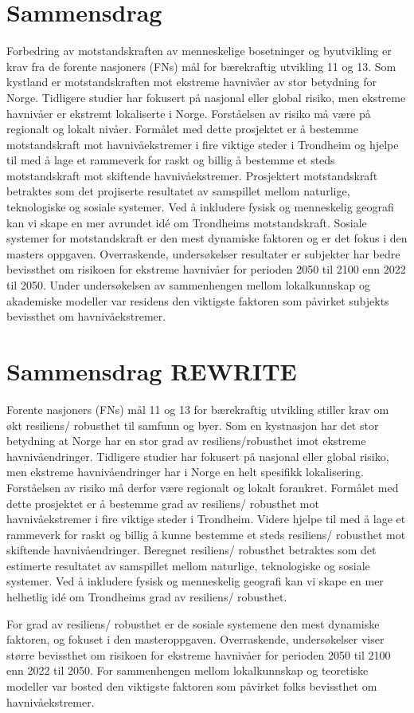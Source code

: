 \section{Sammensdrag}
Forbedring av motstandskraften av menneskelige bosetninger og byutvikling er krav fra de forente nasjoners (FNs) mål for bærekraftig utvikling 11 og 13. Som kystland er motstandskraften mot ekstreme havnivåer av stor betydning for Norge. Tidligere studier har fokusert på nasjonal eller global risiko, men ekstreme havnivåer er ekstremt lokaliserte i Norge. Forståelsen av risiko må være på regionalt og lokalt nivåer. Formålet med dette prosjektet er å bestemme motstandskraft mot havnivåekstremer i fire viktige steder i Trondheim og hjelpe til med å lage et rammeverk for raskt og billig å bestemme et steds motstandskraft mot skiftende havnivåekstremer. Prosjektert motstandskraft betraktes som det projiserte resultatet av samspillet mellom naturlige, teknologiske og sosiale systemer. Ved å inkludere fysisk og menneskelig geografi kan vi skape en mer avrundet idé om Trondheims motstandskraft.
Sosiale systemer for motstandskraft er den mest dynamiske faktoren og er det fokus i den masters oppgaven. Overraskende, undersøkelser resultater er subjekter har bedre bevissthet om risikoen for ekstreme havnivåer for perioden 2050 til 2100 enn 2022 til 2050. Under undersøkelsen av sammenhengen mellom lokalkunnskap og akademiske modeller var residens den viktigste faktoren som påvirket subjekts bevissthet om havnivåekstremer.

\section{Sammensdrag REWRITE}
Forente nasjoners (FNs) mål 11 og 13 for bærekraftig utvikling stiller krav om økt resiliens/ robusthet til samfunn og byer. Som en kystnasjon har det stor betydning at Norge har en stor grad av resiliens/robusthet imot ekstreme havnivåendringer. Tidligere studier har fokusert på nasjonal eller global risiko, men ekstreme havnivåendringer har i Norge en helt spesifikk lokalisering. Forståelsen av risiko må derfor være regionalt og lokalt forankret. Formålet med dette prosjektet er å bestemme grad av resiliens/ robusthet mot havnivåekstremer i fire viktige steder i Trondheim. Videre hjelpe til med å lage et rammeverk for raskt og billig å kunne bestemme et steds resiliens/ robusthet mot skiftende havnivåendringer. Beregnet resiliens/ robusthet betraktes som det estimerte resultatet av samspillet mellom naturlige, teknologiske og sosiale systemer. Ved å inkludere fysisk og menneskelig geografi kan vi skape en mer helhetlig idé om Trondheims grad av resiliens/ robusthet. 

For grad av resiliens/ robusthet er de sosiale systemene den mest dynamiske faktoren, og fokuset i den masteroppgaven. Overraskende, undersøkelser viser større bevissthet om risikoen for ekstreme havnivåer for perioden 2050 til 2100 enn 2022 til 2050. For sammenhengen mellom lokalkunnskap og teoretiske modeller var bosted den viktigste faktoren som påvirket folks bevissthet om havnivåekstremer.